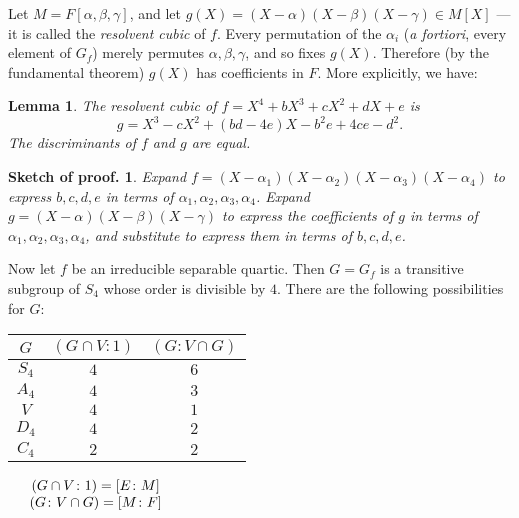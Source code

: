 \documentclass[a4paper,11pt,final,openany]{memoir}
\newtheorem{lemma}[X]{Lemma}
\theoremstyle{nonumberplain}
\newtheorem{sproof}{Sketch of proof.}
\begin{document}
\begin{minipage}{1in}
\end{minipage}


\medskip Let $M=F[\alpha,\beta,\gamma]$, and let $g(X)=(X-\alpha
)(X-\beta)(X-\gamma)\in M[X]$ --- it is called the \emph{resolvent cubic\/}
%
of $f$. Every permutation of the $\alpha_{i}$ (\textit{a fortiori}, every
element of $G_{f}$) merely permutes $\alpha,\beta,\gamma$, and so fixes
$g(X)$. Therefore (by the fundamental theorem) $g(X)$ has coefficients in $F$.
More explicitly, we have:

\begin{lemma}
\label{cg8}The resolvent cubic of $f=X^{4}+bX^{3}+cX^{2}+dX+e$ is
\[
g=X^{3}-cX^{2}+(bd-4e)X-b^{2}e+4ce-d^{2}.
\]
The discriminants of $f$ and $g$ are equal.
\end{lemma}

\begin{sproof}
Expand $f=(X-\alpha_{1})(X-\alpha_{2})(X-\alpha_{3})(X-\alpha_{4})$ to express
$b,c,d,e$ in terms of $\alpha_{1},\alpha_{2},\alpha_{3},\alpha_{4}$. Expand
$g=(X-\alpha)(X-\beta)(X-\gamma)$ to express the coefficients of $g$ in terms
of $\alpha_{1},\alpha_{2},\alpha_{3},\alpha_{4}$, and substitute to express
them in terms of $b,c,d,e$.
\end{sproof}

Now let $f$ be an irreducible separable quartic. Then $G=G_{f}$ is a
transitive subgroup of $S_{4}$ whose order is divisible by $4$. There are the
following possibilities for $G$:\hfill\break

\begin{center}
\renewcommand{\arraystretch}{1.2}%
\begin{tabular}
[c]{|c|c|c|}\hline
{$G$} & {$(G\cap V\colon1)$} & {$(G\colon V\cap G)$}\\\hline
$S_{4}$ & {$4$} & {$6$}\\\hline
$A_{4}$ & {$4$} & {$3$}\\\hline
$V$ & {$4$} & {$1$}\\\hline
{$D_{4}$} & {$4$} & {$2$}\\\hline
{$C_{4}$} & {$2$} & {$2$}\\\hline
\end{tabular}
$\quad%
\begin{array}
[c]{c}%
(G\cap V\colon1)=[E\colon M]\\
(G\colon V\cap G)=[M\colon F]
\end{array}
$
\end{center}
\end{document}
